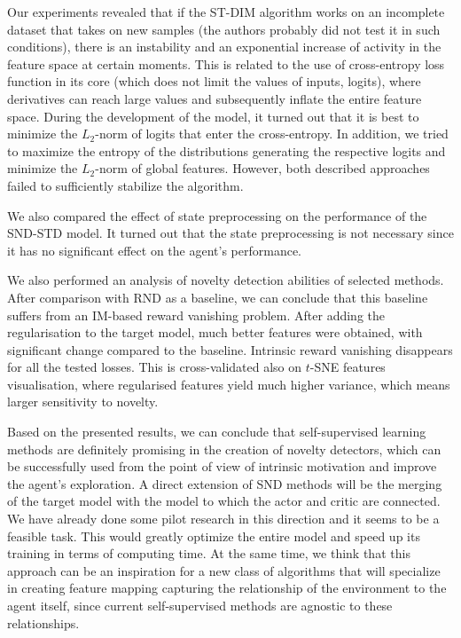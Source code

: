 \documentclass[a4paper,11pt]{elsarticle}
\begin{document}
Our experiments revealed that if the ST-DIM algorithm works on an incomplete dataset that takes on new samples (the authors probably did not test it in such conditions), there is an instability and an exponential increase of activity in the feature space at certain moments. This is related to the use of cross-entropy loss function in its core (which does not limit the values of inputs, logits), where derivatives can reach large values and subsequently inflate the entire feature space. During the development of the model, it turned out that it is best to minimize the $L_2$-norm of logits that enter the cross-entropy. In addition, we tried to maximize the entropy of the distributions generating the respective logits and minimize the $L_2$-norm of global features. However, both described approaches failed to sufficiently stabilize the algorithm.

We also compared the effect of state preprocessing on the performance of the SND-STD model. It turned out that the state preprocessing is not necessary since it has no significant effect on the agent's performance.

We also performed an analysis of novelty detection abilities of selected methods. After comparison with RND as a baseline, we can conclude that this baseline suffers from an IM-based reward vanishing problem. After adding the regularisation to the target model, much better features were obtained, with significant change compared to the baseline. Intrinsic reward vanishing disappears for all the tested losses. This is cross-validated also on $t$-SNE features visualisation, where regularised features yield much higher variance, which means larger sensitivity to novelty.

Based on the presented results, we can conclude that self-supervised learning methods are definitely promising in the creation of novelty detectors, which can be successfully used from the point of view of intrinsic motivation and improve the agent's exploration. A direct extension of SND methods will be the merging of the target model with the model to which the actor and critic are connected. We have already done some pilot research in this direction and it seems to be a feasible task. This would greatly optimize the entire model and speed up its training in terms of computing time.
At the same time, we think that this approach can be an inspiration for a new class of algorithms that will specialize in creating feature mapping capturing the relationship of the environment to the agent itself, since current self-supervised methods are agnostic to these relationships.

\vspace{3,16314mm}
%

 
\end{document}
